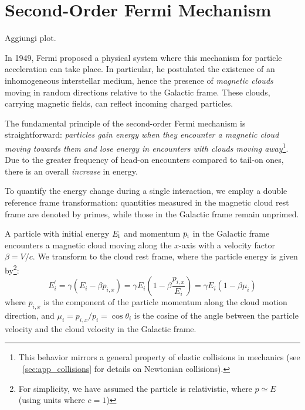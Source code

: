 \section{Second-Order Fermi Mechanism}

{\color{red}Aggiungi plot.}

In 1949, Fermi proposed a physical system where this mechanism for particle acceleration can take place. In particular, he postulated the existence of an inhomogeneous interstellar medium, hence the presence of \emph{magnetic clouds} moving in random directions relative to the Galactic frame. These clouds, carrying magnetic fields, can reflect incoming charged particles.

The fundamental principle of the second-order Fermi mechanism is straightforward: \emph{particles gain energy when they encounter a magnetic cloud moving towards them and lose energy in encounters with clouds moving away}\footnote{This behavior mirrors a general property of elastic collisions in mechanics (see ~\cref{sec:app_collisions} for details on Newtonian collisions).}. Due to the greater frequency of head-on encounters compared to tail-on ones, there is an overall \emph{increase} in energy.

To quantify the energy change during a single interaction, we employ a double reference frame transformation: quantities measured in the magnetic cloud rest frame are denoted by primes, while those in the Galactic frame remain unprimed.

A particle with initial energy \( E_{\rm i} \) and momentum \( p_{\rm i} \) in the Galactic frame encounters a magnetic cloud moving along the \( x \)-axis with a velocity factor \( \beta = V / c \). We transform to the cloud rest frame, where the particle energy is given by\footnote{For simplicity, we have assumed the particle is relativistic, where \( p \simeq E \) (using units where \( c = 1 \))}:
\begin{equation}
E_i^\prime = \gamma (E_i - \beta p_{i,x}) = \gamma E_i \left( 1 - \beta \frac{p_{i,x}}{E_i} \right) = \gamma E_i \left( 1 - \beta \mu_i \right)
\end{equation}
where \( p_{i,x} \) is the component of the particle momentum along the cloud motion direction, and \( \mu_i = p_{i,x} / p_i = \cos\theta_i \) is the cosine of the angle between the particle velocity and the cloud velocity in the Galactic frame.


